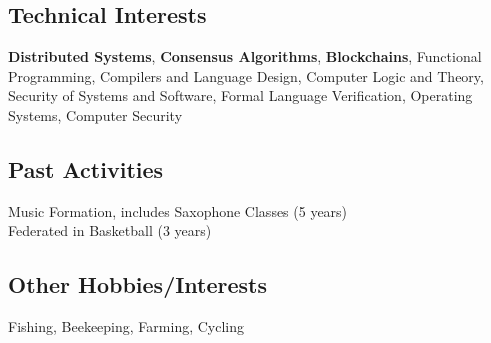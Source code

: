 \documentclass[a4paper,12pt]{article}
\begin{document}


\vspace*{10pt}
\subsection{Technical Interests}
\textbf{Distributed Systems}, \textbf{Consensus Algorithms}, \textbf{Blockchains}, Functional Programming, Compilers and Language Design, Computer Logic and Theory, Security of Systems and Software, Formal Language Verification, Operating Systems, Computer Security

\vspace*{6pt}
\subsection{Past Activities}
Music Formation, includes Saxophone Classes (5 years)\\
Federated in Basketball (3 years)


\vspace*{6pt}
\subsection{Other Hobbies/Interests}
Fishing, Beekeeping, Farming, Cycling
\end{document}
